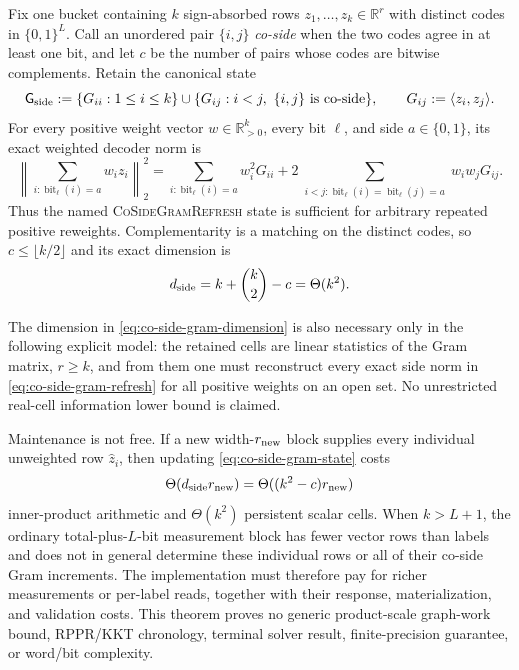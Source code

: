 \begin{theorem}
\label{thm:co-side-gram-refresh}
Fix one bucket containing $k$ sign-absorbed rows
$z_1,\ldots,z_k\in\mathbb R^r$ with distinct codes in $\{0,1\}^L$.  Call an
unordered pair $\{i,j\}$ \emph{co-side} when the two codes agree in at least
one bit, and let $c$ be the number of pairs whose codes are bitwise
complements.  Retain the canonical state
\begin{equation}
 \mathsf G_{\rm side}
 :=\{G_{ii}:1\leq i\leq k\}
 \mathbin{\cup}
 \{G_{ij}:i<j,\ \{i,j\}\text{ is co-side}\},
 \qquad
 G_{ij}:=\langle z_i,z_j\rangle.
 \label{eq:co-side-gram-state}
\end{equation}
For every positive weight vector $w\in\mathbb R_{>0}^k$, every bit
$\ell$, and side $a\in\{0,1\}$, its exact weighted decoder norm is
\begin{equation}
 \left\|\sum_{i:\operatorname{bit}_\ell(i)=a}w_i z_i\right\|_2^2
 =\sum_{i:\operatorname{bit}_\ell(i)=a}w_i^2G_{ii}
 +2\!\sum_{\substack{i<j:\operatorname{bit}_\ell(i)=
                     \operatorname{bit}_\ell(j)=a}}
       w_iw_jG_{ij}.
 \label{eq:co-side-gram-refresh}
\end{equation}
Thus the named \textsc{CoSideGramRefresh} state is sufficient for arbitrary
repeated positive reweights.  Complementarity is a matching on the distinct
codes, so $c\leq\lfloor k/2\rfloor$ and its exact dimension is
\begin{equation}
 d_{\rm side}=k+\binom{k}{2}-c=\Theta(k^2).
 \label{eq:co-side-gram-dimension}
\end{equation}

The dimension in \cref{eq:co-side-gram-dimension} is also necessary only in
the following explicit model: the retained cells are linear statistics of
the Gram matrix, $r\geq k$, and from them one must reconstruct every exact
side norm in \cref{eq:co-side-gram-refresh} for all positive weights on an
open set.  No unrestricted real-cell information lower bound is claimed.

Maintenance is not free.  If a new width-$r_{\rm new}$ block supplies every
individual unweighted row $\widehat z_i$, then updating
\cref{eq:co-side-gram-state} costs
\begin{equation*}
 \Theta(d_{\rm side}r_{\rm new})
 =\Theta((k^2-c)r_{\rm new})
\end{equation*}
inner-product arithmetic and $\Theta(k^2)$ persistent scalar cells.  When
$k>L+1$, the ordinary total-plus-$L$-bit measurement block has fewer vector
rows than labels and does not in general determine these individual rows or
all of their co-side Gram increments.  The implementation must therefore pay
for richer measurements or per-label reads, together with their response,
materialization, and validation costs.  This theorem proves no generic
product-scale graph-work bound, RPPR/KKT chronology, terminal solver result,
finite-precision guarantee, or word/bit complexity.
\end{theorem}

